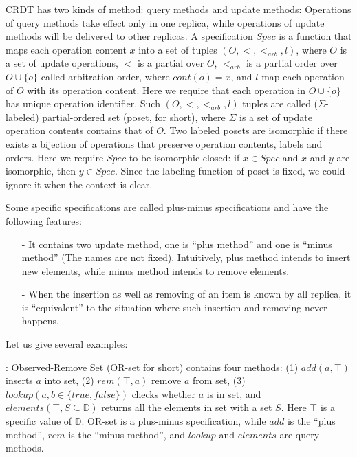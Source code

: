 CRDT has two kinds of method: query methods and update methods: Operations of query methods take effect only in one replica, while operations of update methods will be delivered to other replicas. A specification $Spec$ is a function that maps each operation content $x$ into a set of tuples $(O,<,<_{\textit{arb}},l)$, where {\color {red}$O$ is a set of update operations}, $<$ is a partial over $O$, {\color {red}$<_{\textit{arb}}$ is a partial order over $O \cup \{ o \}$ called arbitration order, where $cont(o)=x$}, and $l$ map each operation of $O$ with its operation content. Here we require that each operation in $O \cup \{ o \}$ has unique operation identifier. Such $(O,<,<_{\textit{arb}},l)$ tuples are called ($\Sigma$-labeled) partial-ordered set (poset, for short), where $\Sigma$ is a set of update operation contents contains that of $O$. Two labeled posets are isomorphic if there exists a bijection of operations that preserve operation contents, labels and orders. Here we require $Spec$ to be isomorphic closed: if $x \in Spec$ and $x$ and $y$ are isomorphic, then $y \in Spec$. Since the labeling function of poset is fixed, we could ignore it when the context is clear.


Some specific specifications are called plus-minus specifications and have the following features:

\begin{itemize}
\setlength{\itemsep}{0.5pt}
\item[-] It contains two update method, one is ``plus method'' and one is ``minus method'' (The names are not fixed). Intuitively, plus method intends to insert new elements, while minus method intends to remove elements.

\item[-] When the insertion as well as removing of an item is known by all replica, it is ``equivalent'' to the situation where such insertion and removing never happens.
\end{itemize}

Let us give several examples:

: Observed-Remove Set (OR-set for short) \cite{Shapiro:2011,Bieniusa:2012} contains four methods: (1) $add(a,\top)$ inserts $a$ into set, (2) $rem(\top,a)$ remove $a$ from set, (3) $lookup(a, b \in \{ \textit{true}, \textit{false} \})$ checks whether $a$ is in set, and $elements(\top, S \subseteq \mathbb{D})$ returns all the elements in set with a set $S$. Here $\top$ is a specific value of $\mathbb{D}$. OR-set is a plus-minus specification, while $add$ is the ``plus method'', $rem$ is the ``minus method'', and $lookup$ and $elements$ are query methods.

